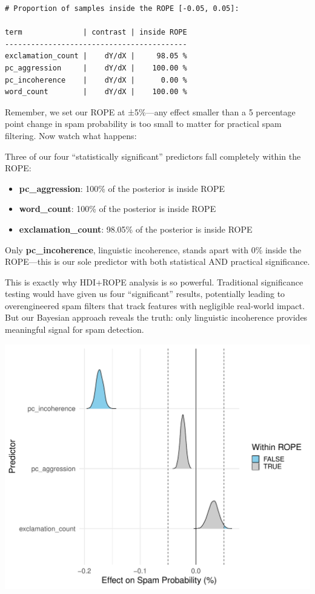 \documentclass[
  letterpaper,
  DIV=11,
  numbers=noendperiod]{scrartcl}
\providecommand{\tightlist}{%
  \setlength{\itemsep}{0pt}\setlength{\parskip}{0pt}}\usepackage{longtable,booktabs,array}
\begin{document}
\begin{verbatim}
# Proportion of samples inside the ROPE [-0.05, 0.05]:

term              | contrast | inside ROPE
------------------------------------------
exclamation_count |    dY/dX |     98.05 %
pc_aggression     |    dY/dX |    100.00 %
pc_incoherence    |    dY/dX |      0.00 %
word_count        |    dY/dX |    100.00 %
\end{verbatim}

Remember, we set our ROPE at ±5\%---any effect smaller than a 5
percentage point change in spam probability is too small to matter for
practical spam filtering. Now watch what happens:

Three of our four ``statistically significant'' predictors fall
completely within the ROPE:

\begin{itemize}
\tightlist
\item
  \textbf{pc\_aggression}: 100\% of the posterior is inside ROPE
\item
  \textbf{word\_count}: 100\% of the posterior is inside ROPE
\item
  \textbf{exclamation\_count}: 98.05\% of the posterior is inside ROPE
\end{itemize}

Only \textbf{pc\_incoherence}, linguistic incoherence, stands apart with
0\% inside the ROPE---this is our sole predictor with both statistical
AND practical significance.

This is exactly why HDI+ROPE analysis is so powerful. Traditional
significance testing would have given us four ``significant'' results,
potentially leading to overengineered spam filters that track features
with negligible real-world impact. But our Bayesian approach reveals the
truth: only linguistic incoherence provides meaningful signal for spam
detection.

\begin{center}
\includegraphics[width=0.8\linewidth,height=\textheight,keepaspectratio]{Beyond!!!_files/figure-pdf/unnamed-chunk-13-1.pdf}
\end{center}
\end{document}
